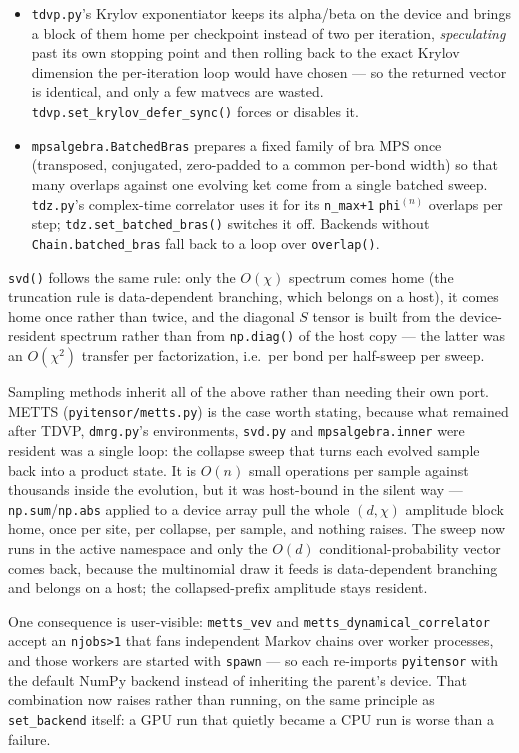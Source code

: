\documentclass[11pt]{article}
\begin{document}
\begin{itemize}
\item \texttt{tdvp.py}'s Krylov exponentiator keeps its alpha/beta on the
  device and brings a block of them home per checkpoint instead of two per
  iteration, \emph{speculating} past its own stopping point and then
  rolling back to the exact Krylov dimension the per-iteration loop would
  have chosen --- so the returned vector is identical, and only a few
  matvecs are wasted. \texttt{tdvp.set\_krylov\_defer\_sync()} forces or
  disables it.
\item \texttt{mpsalgebra.BatchedBras} prepares a fixed family of bra MPS
  once (transposed, conjugated, zero-padded to a common per-bond width) so
  that many overlaps against one evolving ket come from a single batched
  sweep. \texttt{tdz.py}'s complex-time correlator uses it for its
  \texttt{n\_max+1} \texttt{phi}$^{(n)}$ overlaps per step;
  \texttt{tdz.set\_batched\_bras()} switches it off. Backends without
  \texttt{Chain.batched\_bras} fall back to a loop over
  \texttt{overlap()}.
\end{itemize}

\texttt{svd()} follows the same rule: only the $O(\chi)$ spectrum comes
home (the truncation rule is data-dependent branching, which belongs on a
host), it comes home once rather than twice, and the diagonal $S$ tensor is
built from the device-resident spectrum rather than from \texttt{np.diag()}
of the host copy --- the latter was an $O(\chi^2)$ transfer per
factorization, i.e.\ per bond per half-sweep per sweep.

Sampling methods inherit all of the above rather than needing their own
port. METTS (\texttt{pyitensor/metts.py}) is the case worth stating,
because what remained after TDVP, \texttt{dmrg.py}'s environments,
\texttt{svd.py} and \texttt{mpsalgebra.inner} were resident was a single
loop: the collapse sweep that turns each evolved sample back into a
product state. It is $O(n)$ small operations per sample against thousands
inside the evolution, but it was host-bound in the silent way ---
\texttt{np.sum}/\texttt{np.abs} applied to a device array pull the whole
$(d,\chi)$ amplitude block home, once per site, per collapse, per sample,
and nothing raises. The sweep now runs in the active namespace and only
the $O(d)$ conditional-probability vector comes back, because the
multinomial draw it feeds is data-dependent branching and belongs on a
host; the collapsed-prefix amplitude stays resident.

One consequence is user-visible: \texttt{metts\_vev} and
\texttt{metts\_dynamical\_correlator} accept an \texttt{njobs>1} that
fans independent Markov chains over worker processes, and those workers
are started with \texttt{spawn} --- so each re-imports
\texttt{pyitensor} with the default NumPy backend instead of inheriting
the parent's device. That combination now raises rather than running, on
the same principle as \texttt{set\_backend} itself: a GPU run that
quietly became a CPU run is worse than a failure.
\end{document}
